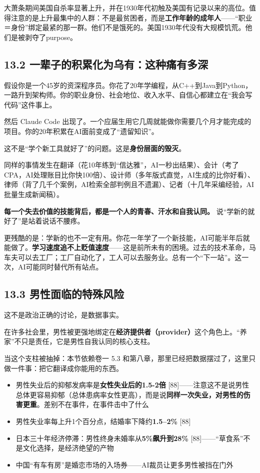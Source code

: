 \documentclass[11pt,a4paper]{ctexart}
\begin{document}
大萧条期间美国自杀率显著上升，并在1930年代初触及美国有记录以来的高位。值得注意的是上升最集中的人群：不是最贫困者，而是\textbf{工作年龄的成年人}——“职业＝身份”绑定最紧的那一群。他们不是饿死的。美国1930年代没有大规模饥荒。他们是被剥夺了purpose。

\subsection{13.2 一辈子的积累化为乌有：这种痛有多深}

假设你是一个45岁的资深程序员。你花了20年学编程，从C++到Java到Python，一路升到架构师。你的职业身份、社会地位、收入水平、自信心都建立在“我会写代码”这件事上。

然后 Claude Code 出现了。一个应届生用它几周就能做你需要几个月才能完成的项目。你的20年积累在AI面前变成了“遗留知识”。

这不是“学个新工具就好了”的问题。这是\textbf{身份层面的毁灭}。

同样的事情发生在翻译（花10年练到“信达雅”，AI一秒出结果）、会计（考了CPA，AI处理账目比你快100倍）、设计师（多年版式直觉，AI生成的比你好看）、律师（背了几千个案例，AI检索全部判例且不遗漏）、记者（十几年采编经验，AI批量生成新闻稿）。

\textbf{每一个失去价值的技能背后，都是一个人的青春、汗水和自我认同。} 说“学新的就好了”是站着说话不腰疼。

更残酷的是：学新的也不一定有用。你花一年学了一个新技能，AI可能半年后就能做了。\textbf{学习速度追不上贬值速度}——这是前所未有的困境。过去的技术革命，马车夫可以去工厂；工厂自动化了，工人可以去服务业。总有一个“下一站”。这一次，AI可能同时替代所有站点。

\subsection{13.3 男性面临的特殊风险}

这不是政治正确的讨论，是数据事实。

在许多社会里，男性被更强地绑定在\textbf{经济提供者（provider）}这个角色上。“养家”不只是责任，它是男性自我认同的核心支柱。

当这个支柱被抽掉：本节依赖卷一 5.3 和第八章，那里已经把数据摆过了，这里只做一件事：把它翻译成你能用的东西。

\begin{itemize}
  \item 男性失业后的抑郁发病率是\textbf{女性失业后的1.5-2倍}{} [88]——注意这不是说男性总体更容易抑郁（总体患病率女性更高），而是说\textbf{同样一次失业，对男性的伤害更重}。差别不在事件，在事件击中了什么
  \item 男性失业率每上升1个百分点，结婚率下降约\textbf{1.5--2\%}{} [88]
  \item 日本三十年经济停滞：男性终身未婚率从\textbf{5\%飙升到28\%}{} [88]——“草食系”不是文化选择，是经济绝望的产物
  \item 中国“有车有房”是婚恋市场的入场券——AI裁员让更多男性被挡在门外
\end{itemize}
\end{document}
